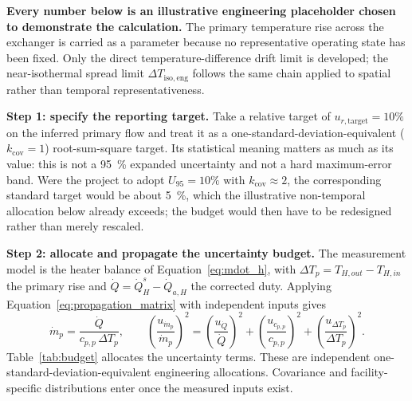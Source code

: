 \documentclass[11pt]{article}
\newcommand{\QHs}{\dot Q_{H}^{s}}
\newcommand{\mdotp}{\dot m_{p}}
\begin{document}
\textbf{Every number below is an illustrative engineering placeholder chosen to demonstrate the calculation.} The primary temperature rise across the exchanger is carried as a parameter because no representative operating state has been fixed. Only the direct temperature-difference drift limit is developed; the near-isothermal spread limit $\Delta T_{\mathrm{iso,eng}}$ follows the same chain applied to spatial rather than temporal representativeness.

\textbf{Step 1: specify the reporting target.} Take a relative target of $u_{r,\mathrm{target}}=10\%$ on the inferred primary flow and treat it as a one-standard-deviation-equivalent ($k_{\mathrm{cov}}=1$) root-sum-square target. Its statistical meaning matters as much as its value: this is not a \SI{95}{\percent} expanded uncertainty and not a hard maximum-error band. Were the project to adopt $U_{95}=10\%$ with $k_{\mathrm{cov}}\approx2$, the corresponding standard target would be about \SI{5}{\percent}, which the illustrative non-temporal allocation below already exceeds; the budget would then have to be redesigned rather than merely rescaled.

\textbf{Step 2: allocate and propagate the uncertainty budget.} The measurement model is the heater balance of Equation~\eqref{eq:mdot_h}, with $\Delta T_p=T_{H,out}-T_{H,in}$ the primary rise and $\dot Q=\QHs-\dot Q_{a,H}$ the corrected duty. Applying Equation~\eqref{eq:propagation_matrix} with independent inputs gives
\begin{equation}
\mdotp=\frac{\dot Q}{c_{p,p}\,\Delta T_p},\qquad
\left(\frac{u_{\mdotp}}{\mdotp}\right)^2
=\left(\frac{u_{\dot Q}}{\dot Q}\right)^2
+\left(\frac{u_{c_{p,p}}}{c_{p,p}}\right)^2
+\left(\frac{u_{\Delta T_p}}{\Delta T_p}\right)^2 .
\label{eq:budget_flow}
\end{equation}
Table~\ref{tab:budget} allocates the uncertainty terms. These are independent one-standard-deviation-equivalent engineering allocations. Covariance and facility-specific distributions enter once the measured inputs exist.
\end{document}
